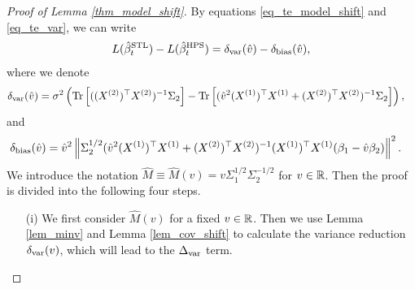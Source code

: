 \begin{proof}[Proof of Lemma \ref{thm_model_shift}]
By equations \eqref{eq_te_model_shift} and \eqref{eq_te_var}, we can write
\begin{align*}
L(\hat{\beta}_t^{\textup{STL}}) - L(\hat{\beta}_t^{\textup{HPS}})=\delta_{\text{var}}(\hat v) - \delta_{\text{bias}}(\hat v),
\end{align*}
where we denote
\begin{align*}
\delta_{\text{var}}(\hat v)&=\sigma^2 \left(  \operatorname{Tr}\left[((X^{(2)})^{\top}X^{(2)})^{-1}\Sigma_2\right] -  \operatorname{Tr}\left[( \hat{v}^2 (X^{(1)})^{\top}X^{(1)} + (X^{(2)})^{\top}X^{(2)})^{-1} \Sigma_2\right]\right),
\end{align*}
and
\begin{align}\label{revise_deltabias}
 \delta_{\text{bias}}(\hat v)&= \hat{v}^2 \left\| \Sigma_2^{1/2}(\hat{v}^2 (X^{(1)})^{\top}X^{(1)} + (X^{(2)})^{\top}X^{(2)})^{-1} (X^{(1)})^{\top}X^{(1)} (\beta_1 - \hat{v} \beta_2) \right\|^2.
\end{align}
We introduce the notation $\hat M \equiv \hat M(v)= v\Sigma_1^{1/2}\Sigma_2^{-1/2}$ for $v\in \mathbb{R}$. Then the proof is divided into the following four steps.
\begin{itemize}
\item[(i)] We first consider $ \hat M(v)$ for a fixed $v\in \mathbb{R}$. Then we use Lemma \ref{lem_minv} and Lemma \ref{lem_cov_shift} to calculate the variance reduction $\delta_{\text{var}}(v)$, which will lead to the $\Delta_{\text{var}}$ term.


\end{itemize}
\end{proof}
